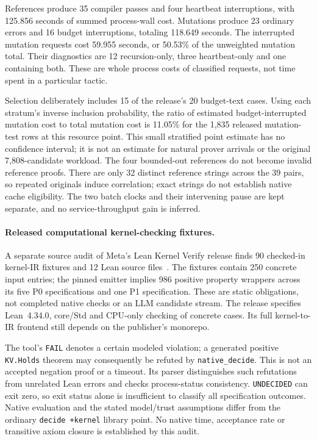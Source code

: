 \documentclass[10pt,twocolumn]{article}
\begin{document}
References produce 35 compiler passes and four heartbeat interruptions,
with 125.856 seconds of summed process-wall cost. Mutations produce 23
ordinary errors and 16 budget interruptions, totaling 118.649 seconds.
The interrupted mutation requests cost 59.955 seconds, or 50.53\% of the
unweighted mutation total. Their diagnostics are 12 recursion-only,
three heartbeat-only and one containing both. These are whole process
costs of classified requests, not time spent in a particular tactic.

Selection deliberately includes 15 of the release's 20 budget-text cases.
Using each stratum's inverse inclusion probability, the ratio of estimated
budget-interrupted mutation cost to total mutation cost is 11.05\% for
the 1,835 released mutation-test rows at this resource point. This small
stratified point estimate has no confidence interval; it is not an estimate
for natural prover arrivals or the original 7,808-candidate workload.
The four bounded-out references do not become invalid reference proofs.
There are only 32 distinct reference strings across the 39 pairs, so repeated
originals induce correlation; exact strings do not establish native cache
eligibility. The two batch clocks and their intervening pause are kept
separate, and no service-throughput gain is inferred.

\paragraph{Released computational kernel-checking fixtures.}
A separate source audit of Meta's Lean Kernel Verify release finds 90
checked-in kernel-IR fixtures and 12 Lean source files~\cite{leanKernelVerify}.
The fixtures contain 250 concrete input entries; the pinned emitter implies
986 positive property wrappers across its five P0 specifications and one
P1 specification. These are static obligations, not completed native checks
or an LLM candidate stream. The release specifies Lean~4.34.0, core/Std and
CPU-only checking of concrete cases. Its full kernel-to-IR frontend still
depends on the publisher's monorepo.

The tool's \texttt{FAIL} denotes a certain modeled violation; a generated
positive \texttt{KV.Holds} theorem may consequently be refuted by
\texttt{native\_decide}. This is not an accepted negation proof or a timeout.
Its parser distinguishes such refutations from unrelated Lean errors and
checks process-status consistency. \texttt{UNDECIDED} can exit zero, so exit
status alone is insufficient to classify all specification outcomes.
Native evaluation and the stated model/trust assumptions differ from the
ordinary \texttt{decide +kernel} library point. No native time, acceptance
rate or transitive axiom closure is established by this audit.
\end{document}
